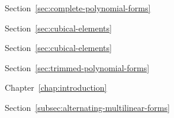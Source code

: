 \par\noindent\hspace*{0em}\label{index:finite-element-space}

\par\noindent\hspace*{1em}\label{index:finite-element-space-complete-polynomial}\quad Section~\ref{sec:complete-polynomial-forms}

\par\noindent\hspace*{1em}\label{index:finite-element-space-cubical}\quad Section~\ref{sec:cubical-elements}

\par\noindent\hspace*{1em}\label{index:finite-element-space-serendipity}\quad Section~\ref{sec:cubical-elements}

\par\noindent\hspace*{1em}\label{index:finite-element-space-trimmed-polynomial}\quad Section~\ref{sec:trimmed-polynomial-forms}

\par\noindent\hspace*{0em}\label{index:finite-elements-lagrange}\quad Chapter~\ref{chap:introduction}

\par\noindent\hspace*{0em}\label{index:form}

\par\noindent\hspace*{1em}\label{index:form-alternating}\quad Section~\ref{subsec:alternating-multilinear-forms}

